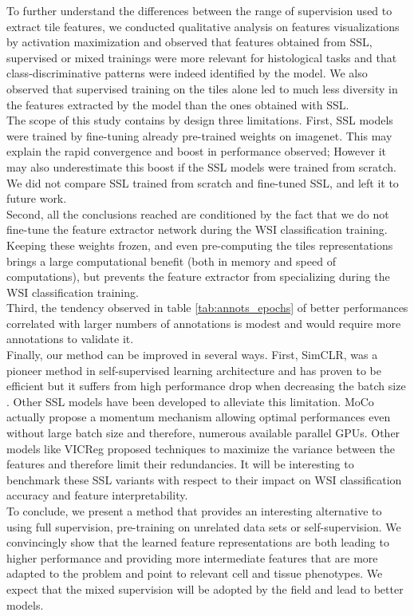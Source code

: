 To further understand the differences between the range of supervision used to extract tile features, we conducted qualitative analysis on features visualizations by activation maximization and observed that features obtained from SSL, supervised or mixed trainings were more relevant for histological tasks and that class-discriminative patterns were indeed identified by the model. We also observed that supervised training on the tiles alone led to much less diversity in the features extracted by the model than the ones obtained with SSL.\\

The scope of this study contains by design three limitations.
First, SSL models were trained by fine-tuning already pre-trained weights on imagenet. This may explain the rapid convergence and boost in performance observed; However it may also underestimate this boost if the SSL models were trained from scratch. We did not compare SSL trained from scratch and fine-tuned SSL, and left it to future work. \\

Second, all the conclusions reached are conditioned by the fact that we do not fine-tune the feature extractor network during the WSI classification training. Keeping these weights frozen, and even pre-computing the tiles representations brings a large computational benefit (both in memory and speed of computations), but prevents the feature extractor from specializing during the WSI classification training. \\

Third, the tendency observed in table \ref{tab:annots_epochs} of better performances correlated with larger numbers of annotations is modest and would require more annotations to validate it. \\

Finally, our method can be improved in several ways. First, SimCLR, was a pioneer method in self-supervised learning architecture and has proven to be efficient but it suffers from high performance drop when decreasing the batch size \citep{chen_simple_2020}. Other SSL models have been developed to alleviate this limitation. MoCo \citep{he_momentum_2020} actually propose a momentum mechanism allowing optimal performances even without large batch size and therefore, numerous available parallel GPUs. Other models like VICReg \citep{bardes_vicreg_2021} proposed  techniques to maximize the variance between the features and therefore limit their redundancies. It will be interesting to benchmark these SSL variants with respect to their impact on WSI classification accuracy and feature interpretability. \\

To conclude, we present a method that provides an interesting alternative to using full supervision, pre-training on unrelated data sets or self-supervision. We convincingly show that the learned feature representations are both leading to higher performance and providing more intermediate features that are more adapted to the problem and point to relevant cell and tissue phenotypes. We expect that the mixed supervision will be adopted by the field and lead to better models. 






